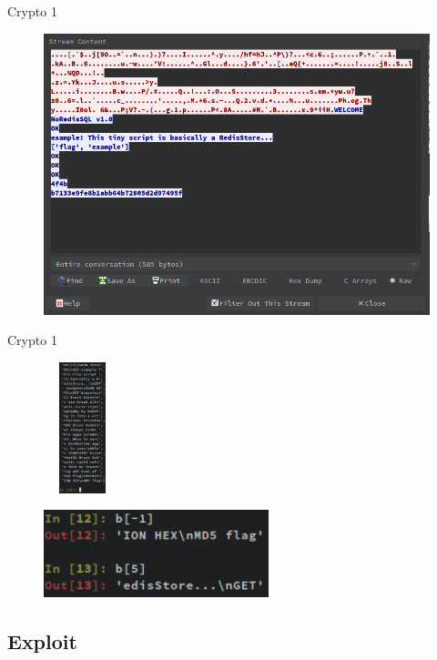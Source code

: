 \documentclass[compress]{beamer}
\begin{document}
\begin{frame}{Crypto 1}
	\begin{figure}
		\centering
		\includegraphics[width=\textwidth]{images/c11.png}
	\end{figure}
\end{frame}

\begin{frame}{Crypto 1}
	\begin{figure}
		\centering
		\includegraphics[width=0.2\textwidth,height=1.5in]{images/c13.png}
	\end{figure}
	\begin{figure}
		\centering
		\includegraphics[height=1in]{images/c14.png}
	\end{figure}    
\end{frame}

\subsection{Exploit}
\end{document}
